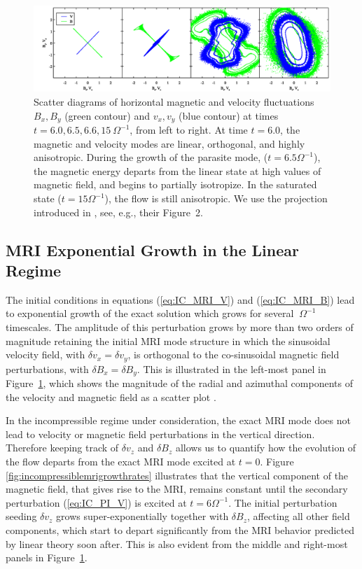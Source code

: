 \documentclass[]{emulateapj}
\begin{document}
\begin{figure}[t]
\begin{center}
\includegraphics[width=0.99 \textwidth]{f8.png}
\caption{
Scatter diagrams of horizontal magnetic  and velocity fluctuations 
$B_x, B_y$ (green contour) and $v_x, v_y$ (blue contour) at times 
$t=6.0,6.5,6.6,15 ~ \Omega^{-1}$, from left to right.
At time $t=6.0$, the magnetic and velocity 
modes are linear, orthogonal, and highly anisotropic. 
During the growth of the parasite mode, ($t=6.5\Omega^{-1}$), the magnetic 
energy departs from the linear state at high values of magnetic field, and begins 
to partially isotropize. 
In the saturated state ($t=15\Omega^{-1}$), the flow is still anisotropic.
We use the projection introduced in \citet{Pessah:2008bf}, see, e.g., their Figure~2.
}
\label{fig:phasespacebxby}
\end{center}
\end{figure}


\subsection{MRI Exponential Growth in the Linear Regime}

The initial conditions in equations (\ref{eq:IC_MRI_V}) and
(\ref{eq:IC_MRI_B}) lead to exponential growth of the exact solution
which grows for several $~\Omega^{-1}$ timescales. The amplitude of this perturbation
grows by more than two orders of magnitude retaining the initial MRI
mode structure in which the sinusoidal velocity field, with $\delta
v_x = \delta v_y$, is orthogonal to the co-sinusoidal magnetic field
perturbations, with $\delta B_x = \delta B_y$.  This is illustrated in
the left-most panel in Figure~\ref{fig:phasespacebxby}, which shows
the magnitude of the radial and azimuthal components of the velocity
and magnetic field \citep{Pessah:2008bf} as a scatter plot \citep[see, e.g.,][]{2008A&A...487....1B}. 

In the incompressible regime under consideration, the exact MRI mode
does not lead to velocity or magnetic field perturbations in the
vertical direction. Therefore keeping track of $\delta v_z$ and
$\delta B_z$ allows us to quantify how the evolution of the flow
departs from the exact MRI mode excited at $t=0$. Figure~ 
\ref{fig:incompressiblemrigrowthrates} illustrates that the
vertical component of the magnetic field, that gives rise to the MRI,
remains constant until the secondary perturbation (\ref{eq:IC_PI_V})
is excited at $t=6\Omega^{-1}$. The initial perturbation seeding $\delta v_z$ 
grows super-exponentially together with $\delta B_z$, affecting
all other field components, which start to depart significantly 
from the MRI behavior predicted by linear theory soon after. This 
is also evident from the middle and right-most panels in Figure~\ref{fig:phasespacebxby}.
\end{document}
